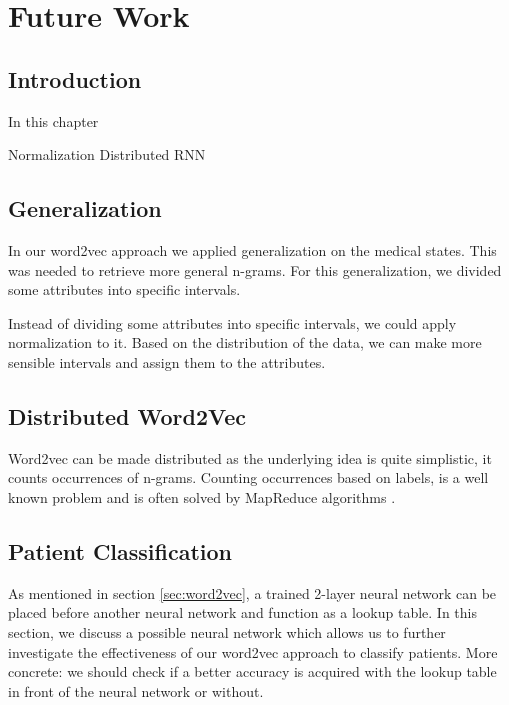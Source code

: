 \graphicspath{ {FutureWork/Images/} }


\chapter{Future Work}
\label{cha:futureWork}

\section{Introduction}
In this chapter 

Normalization
Distributed
RNN


\section{Generalization}

In our word2vec approach we applied generalization on the medical states. This was needed to retrieve more general n-grams. For this generalization, we divided some attributes into specific intervals.

Instead of dividing some attributes into specific intervals, we could apply normalization to it. Based on the distribution of the data, we can make more sensible intervals and assign them to the attributes.


\section{Distributed Word2Vec}

Word2vec can be made distributed as the underlying idea is quite simplistic, it counts occurrences of n-grams. Counting occurrences based on labels, is a well known problem and is often solved by MapReduce algorithms \cite{mapreduce:article}. 


\section{Patient Classification}
\label{sec:PatientClassification}

As mentioned in section \ref{sec:word2vec}, a trained 2-layer neural network can be placed before another neural network and function as a lookup table. In this section, we discuss a possible neural network which allows us to further investigate the effectiveness of our word2vec approach to classify patients. More concrete: we should check if a better accuracy is acquired with the lookup table in front of the neural network or without. 

